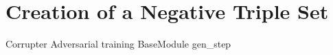 \section{Creation of a Negative Triple Set}
\label{sec:creation_of_a_negative_triple_set}

Corrupter
Adversarial training
BaseModule gen\_step

    
    
    